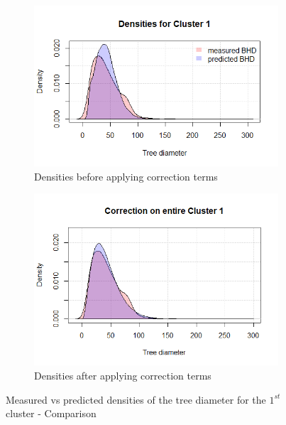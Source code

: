 \begin{figure}[H]
\centering
\begin{subfigure}{.5\textwidth}
  \centering
  \includegraphics[width=.9\linewidth]{dens1.png}
  \caption{Densities before applying correction terms}
  \label{fig:dens1}
\end{subfigure}%
\begin{subfigure}{.5\textwidth}
  \centering
  \includegraphics[width=0.843\linewidth]{correction_entire_cluster1.png}
  \caption{Densities after applying correction terms}
  \label{fig:cluster1_pred}
\end{subfigure}
\caption{Measured vs predicted densities of the tree diameter for the $1^{st}$ cluster - Comparison}
\label{fig:cluster1_entire_corrected}
\end{figure}

